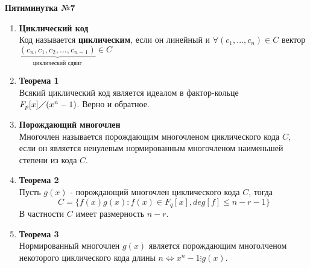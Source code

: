 \documentclass[a4paper, 12pt]{report}
\begin{document}
\newpage
\textbf{Пятиминутка №7}

\begin{enumerate}
    \item \textbf{Циклический код}\\
    Код называется \textbf{циклическим}, если он линейный и $\forall(c_{1},...,c_{n})\in C$ вектор $\underbrace{(c_{n}, c_{1}, c_{2}, ..., c_{n-1})}_{\text{циклический сдвиг}}\in C$
    
    \item \textbf{Теорема 1}\\
    Всякий циклический код является идеалом в фактор-кольце\\ $F_{p}[x]\diagup(x^{n}-1)$. Верно и обратное.
    
    \item \textbf{Порождающий многочлен}\\
    Многочлен называется порождающим многочленом циклического кода $C$, если он является ненулевым нормированным многочленом наименьшей степени из кода $C$.
    
    \item \textbf{Теорема 2}\\
    Пусть $g(x)$ - порождающий многочлен циклического кода $C$, тогда
    $$C = \lbrace f(x)g(x):f(x)\in F_{q}[x], deg[f] \leq n -r -1\rbrace$$
    В частности $C$ имеет размерность $n-r$.
    
    \item \textbf{Теорема 3}\\
    Нормированный многочлен $g(x)$ является порождающим многолченом некоторого циклического кода длины $n \Leftrightarrow x^{n}-1\vdots g(x)$.
    
    
\end{enumerate}
\end{document}
